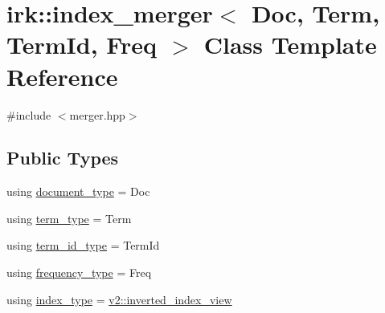 \hypertarget{classirk_1_1index__merger}{}\section{irk\+:\+:index\+\_\+merger$<$ Doc, Term, Term\+Id, Freq $>$ Class Template Reference}
\label{classirk_1_1index__merger}


{\ttfamily \#include $<$merger.\+hpp$>$}

\subsection*{Public Types}
\begin{DoxyCompactItemize}
\item 
using \mbox{\hyperlink{classirk_1_1index__merger_ace9b689f5d38f6aeed3ce16f0f1bd260}{document\+\_\+type}} = Doc
\item 
using \mbox{\hyperlink{classirk_1_1index__merger_a2b76203064ec60dc3b0fa662fd8aa3f0}{term\+\_\+type}} = Term
\item 
using \mbox{\hyperlink{classirk_1_1index__merger_a3731db86b5c514a2dd44555c07abe58e}{term\+\_\+id\+\_\+type}} = Term\+Id
\item 
using \mbox{\hyperlink{classirk_1_1index__merger_a6cb409ab2e737118969206ee9b27d147}{frequency\+\_\+type}} = Freq
\item 
using \mbox{\hyperlink{classirk_1_1index__merger_a1bf6f9a6e9b338abc526274e3ba7407c}{index\+\_\+type}} = \mbox{\hyperlink{classirk_1_1v2_1_1inverted__index__view}{v2\+::inverted\+\_\+index\+\_\+view}}
\end{DoxyCompactItemize}
